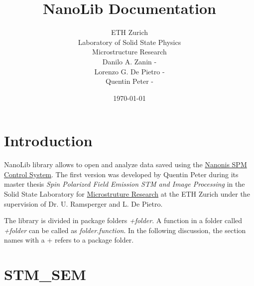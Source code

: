 

\usepackage{amsmath}
\renewcommand{\familydefault}{\sfdefault}
\setlength\parindent{0pt}


\newcommand{\+}[1]{\item \textbf{#1}}

\title{NanoLib Documentation}
\author{
ETH Zurich\\
Laboratory of Solid State Physics\\\vspace{.5em}
Microstructure Research\\ 
{\small Danilo A. Zanin - }\\
{\small Lorenzo G. De Pietro - }\\
{\small Quentin Peter - }
}

\date{\today}


\maketitle



\tableofcontents
\newpage

\section{Introduction}
NanoLib library allows to open and analyze data saved using the \href{http://www.specs-zurich.com/en/home.html;jsessionid=FCD8A587EE447665C3F4A8CC374671EE}{Nanonis SPM Control System}.
The first version was developed by Quentin Peter during its master thesis \emph{Spin Polarized Field Emission STM and Image Processing} in the Solid State Laboratory for \href{http://www.microstructure.ethz.ch}{Microstruture Research} at the ETH Zurich under the supervision of Dr. U. Ramsperger and L. De Pietro.

The library is divided in package folders \emph{+folder}. 
A function in a folder called \emph{+folder} can be called as \emph{folder.function}.
In the following discussion, the section names with a + refers to a package folder.

\section{STM\_SEM}
